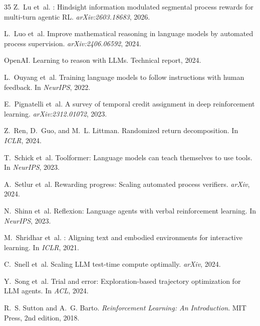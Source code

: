 \documentclass[11pt]{article}
\begin{document}
\begin{thebibliography}{35}
Z.~Lu et~al.
: Hindsight information modulated segmental process rewards for multi-turn agentic {RL}.
\newblock \emph{arXiv:2603.18683}, 2026.

L.~Luo et~al.
\newblock Improve mathematical reasoning in language models by automated process supervision.
\newblock \emph{arXiv:2406.06592}, 2024.

{OpenAI}.
\newblock Learning to reason with {LLMs}.
\newblock Technical report, 2024.

L.~Ouyang et~al.
\newblock Training language models to follow instructions with human feedback.
\newblock In \emph{NeurIPS}, 2022.

E.~Pignatelli et~al.
\newblock A survey of temporal credit assignment in deep reinforcement learning.
\newblock \emph{arXiv:2312.01072}, 2023.

Z.~Ren, D.~Guo, and M.~L. Littman.
\newblock Randomized return decomposition.
\newblock In \emph{ICLR}, 2024.

T.~Schick et~al.
\newblock Toolformer: Language models can teach themselves to use tools.
\newblock In \emph{NeurIPS}, 2023.

A.~Setlur et~al.
\newblock Rewarding progress: Scaling automated process verifiers.
\newblock \emph{arXiv}, 2024.

N.~Shinn et~al.
\newblock Reflexion: Language agents with verbal reinforcement learning.
\newblock In \emph{NeurIPS}, 2023.

M.~Shridhar et~al.
: Aligning text and embodied environments for interactive learning.
\newblock In \emph{ICLR}, 2021.

C.~Snell et~al.
\newblock Scaling {LLM} test-time compute optimally.
\newblock \emph{arXiv}, 2024.

Y.~Song et~al.
\newblock Trial and error: Exploration-based trajectory optimization for {LLM} agents.
\newblock In \emph{ACL}, 2024.

R.~S. Sutton and A.~G. Barto.
\newblock \emph{Reinforcement Learning: An Introduction}.
\newblock MIT Press, 2nd edition, 2018.


\end{thebibliography}
\end{document}
